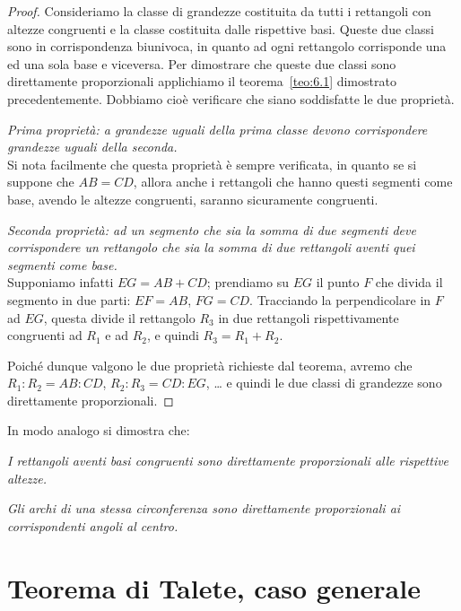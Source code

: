 \begin{proof}
Consideriamo la classe di grandezze costituita da tutti i rettangoli 
con altezze congruenti e la classe costituita dalle rispettive basi. 
Queste due classi sono in corrispondenza biunivoca, in quanto ad ogni 
rettangolo corrisponde una ed una sola base e viceversa.
Per dimostrare che queste due classi sono direttamente proporzionali 
applichiamo il teorema~\ref{teo:6.1} dimostrato precedentemente. 
Dobbiamo cioè verificare che siano soddisfatte le due proprietà.

\emph{Prima proprietà: a grandezze uguali della prima classe devono 
corrispondere grandezze uguali della seconda.}\\
Si nota facilmente che questa proprietà è sempre verificata, in 
quanto se si suppone che $AB = CD$, allora anche i rettangoli che 
hanno questi segmenti come base, avendo le altezze congruenti, 
saranno sicuramente congruenti.

\emph{Seconda proprietà: ad un segmento che sia la somma di due 
segmenti deve corrispondere un rettangolo che sia la somma di due 
rettangoli aventi quei segmenti come base.}\\
Supponiamo infatti $EG =  AB + CD$; prendiamo su $EG$ il punto $F$ 
che divida il segmento in due parti: $EF=AB$, $FG=CD$. Tracciando la 
perpendicolare in $F$ ad $EG$, questa divide il rettangolo $R_3$ in 
due rettangoli rispettivamente congruenti ad $R_1$ e ad $R_2$, e 
quindi $R_3= R_1+R_2$.

Poiché dunque valgono le due proprietà richieste dal teorema, avremo 
che $R_1 : R_2 = AB : CD$, 
$R_2 : R_3 = CD  : EG$, \ldots{} e quindi le due classi di grandezze 
sono direttamente proporzionali.
\end{proof}

In modo analogo si dimostra che:
\begin{itemize*}
\item \emph{I rettangoli aventi basi congruenti sono direttamente 
proporzionali alle rispettive altezze.}
\item \emph{Gli archi di una stessa circonferenza sono direttamente 
proporzionali ai corrispondenti angoli al centro.}
\end{itemize*}


\section{Teorema di Talete, caso generale}\label{sect:talete_generale}

